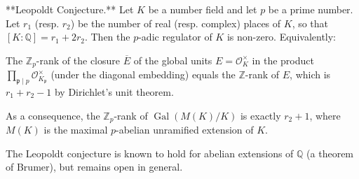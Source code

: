 **Leopoldt Conjecture.** Let $K$ be a number field and let $p$ be a prime number. Let $r_1$ (resp. $r_2$) be the number of real (resp. complex) places of $K$, so that $[K:\mathbb{Q}] = r_1 + 2r_2$. Then the $p$-adic regulator of $K$ is non-zero. Equivalently:

The $\mathbb{Z}_p$-rank of the closure $\overline{E}$ of the global units $E = \mathcal{O}_K^\times$ in the product $\prod_{\mathfrak{p}\mid p} \mathcal{O}_{K_\mathfrak{p}}^\times$ (under the diagonal embedding) equals the $\mathbb{Z}$-rank of $E$, which is $r_1 + r_2 - 1$ by Dirichlet's unit theorem.

As a consequence, the $\mathbb{Z}_p$-rank of $\operatorname{Gal}(M(K)/K)$ is exactly $r_2 + 1$, where $M(K)$ is the maximal $p$-abelian unramified extension of $K$.

The Leopoldt conjecture is known to hold for abelian extensions of $\mathbb{Q}$ (a theorem of Brumer), but remains open in general.
